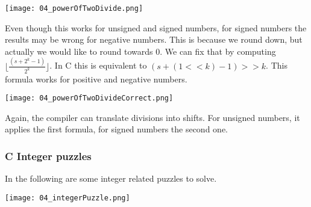 \texttt{[image: 04\_powerOfTwoDivide.png]}

Even though this works for unsigned and signed numbers, for signed numbers the results may be wrong for negative numbers. 
This is because we round down, but actually we would like to round towards $0$. We can fix that by computing $\lfloor \frac{(s + 2^k - 1)}{2^k} \rfloor$. In C this is equivalent to $(s + (1 << k) -1) >> k$. This formula works for positive and negative numbers.

\texttt{[image: 04\_powerOfTwoDivideCorrect.png]}


Again, the compiler can translate divisions into shifts. For unsigned numbers, it applies the first formula, for signed numbers the second one.

\subsubsection{C Integer puzzles}
In the following are some integer related puzzles to solve.

\texttt{[image: 04\_integerPuzzle.png]}
